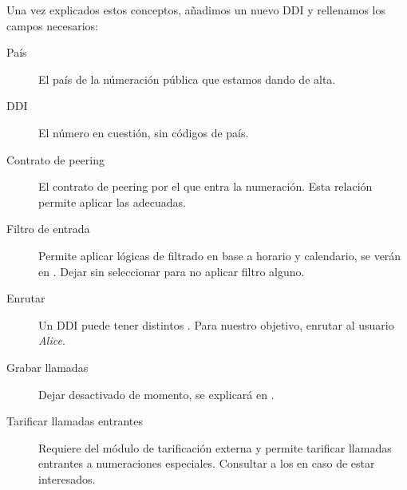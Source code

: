 \documentclass[letterpaper,10pt,spanish]{sphinxmanual}
\begin{document}
Una vez explicados estos conceptos, añadimos un nuevo DDI y rellenamos los campos necesarios:

\label{external_incoming_calls/configure_ddi:bill-inbound}\begin{description}
\item[{País}] \leavevmode{}\label{external_incoming_calls/configure_ddi:term-pais}
El país de la númeración pública que estamos dando de alta.

\item[{DDI}] \leavevmode{}\label{external_incoming_calls/configure_ddi:term-ddi}
El número en cuestión, sin códigos de país.

\item[{Contrato de peering}] \leavevmode{}\label{external_incoming_calls/configure_ddi:term-contrato-de-peering}
El contrato de peering por el que entra la numeración. Esta relación permite aplicar las {\hyperref[external_incoming_calls/numeric_transformations:numeric\string-transformations]{}} adecuadas.

\item[{Filtro de entrada}] \leavevmode{}\label{external_incoming_calls/configure_ddi:term-filtro-de-entrada}
Permite aplicar lógicas de filtrado en base a horario y calendario, se verán en {\hyperref[pbx_features/external_filters:external\string-filters]{}}. Dejar sin seleccionar para no aplicar filtro alguno.

\item[{Enrutar}] \leavevmode{}\label{external_incoming_calls/configure_ddi:term-enrutar}
Un DDI puede tener distintos {\hyperref[pbx_features/external_ddis:routing\string-logics]{}}. Para nuestro objetivo, enrutar al usuario \emph{Alice}.

\item[{Grabar llamadas}] \leavevmode{}\label{external_incoming_calls/configure_ddi:term-grabar-llamadas}
Dejar desactivado de momento, se explicará en {\hyperref[pbx_features/call_recording:call\string-recordings]{}}.

\item[{Tarificar llamadas entrantes}] \leavevmode{}\label{external_incoming_calls/configure_ddi:term-tarificar-llamadas-entrantes}
Requiere del módulo de tarificación externa y permite tarificar llamadas entrantes a numeraciones especiales. Consultar a los {\hyperref[intro/getting_help:getting\string-help]{}} en caso de estar interesados.

\end{description}
\end{document}
